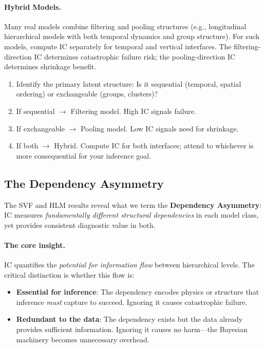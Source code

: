 \documentclass[10pt]{article} %
\theoremstyle{plain}
\theoremstyle{definition}
\begin{document}
\paragraph{Hybrid Models.} Many real models combine filtering and pooling structures (e.g., longitudinal hierarchical models with both temporal dynamics and group structure). For such models, compute IC separately for temporal and vertical interfaces. The filtering-direction IC determines catastrophic failure risk; the pooling-direction IC determines shrinkage benefit.

\begin{tcolorbox}[breakable, colback=gray!5, colframe=black!75, title=\textbf{Model Classification Procedure}, fonttitle=\bfseries]
\begin{enumerate}
    \item Identify the primary latent structure: Is it sequential (temporal, spatial ordering) or exchangeable (groups, clusters)?
    \item If sequential $\to$ Filtering model. High IC signals failure.
    \item If exchangeable $\to$ Pooling model. Low IC signals need for shrinkage.
    \item If both $\to$ Hybrid. Compute IC for both interfaces; attend to whichever is more consequential for your inference goal.
\end{enumerate}
\end{tcolorbox}

\subsection{The Dependency Asymmetry}

The SVF and HLM results reveal what we term the \textbf{Dependency Asymmetry}: IC measures \emph{fundamentally different structural dependencies} in each model class, yet provides consistent diagnostic value in both.

\paragraph{The core insight.} IC quantifies the \emph{potential for information flow} between hierarchical levels. The critical distinction is whether this flow is:
\begin{itemize}
    \item \textbf{Essential for inference}: The dependency encodes physics or structure that inference \emph{must} capture to succeed. Ignoring it causes catastrophic failure.
    \item \textbf{Redundant to the data}: The dependency exists but the data already provides sufficient information. Ignoring it causes no harm---the Bayesian machinery becomes unnecessary overhead.
\end{itemize}
\end{document}
